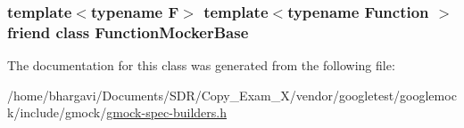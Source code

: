 \subsubsection[{\texorpdfstring{Function\+Mocker\+Base}{FunctionMockerBase}}]{\setlength{\rightskip}{0pt plus 5cm}template$<$typename F$>$ template$<$typename Function $>$ friend class {\bf Function\+Mocker\+Base}\hspace{0.3cm}{\ttfamily [friend]}}\hypertarget{classtesting_1_1internal_1_1_typed_expectation_a1771ea4a3d92d8b2ff0f0aa6fc40ff55}{}\label{classtesting_1_1internal_1_1_typed_expectation_a1771ea4a3d92d8b2ff0f0aa6fc40ff55}


The documentation for this class was generated from the following file\+:\begin{DoxyCompactItemize}
\item 
/home/bhargavi/\+Documents/\+S\+D\+R/\+Copy\+\_\+\+Exam\+\_\+X/vendor/googletest/googlemock/include/gmock/\hyperlink{gmock-spec-builders_8h}{gmock-\/spec-\/builders.\+h}\end{DoxyCompactItemize}
